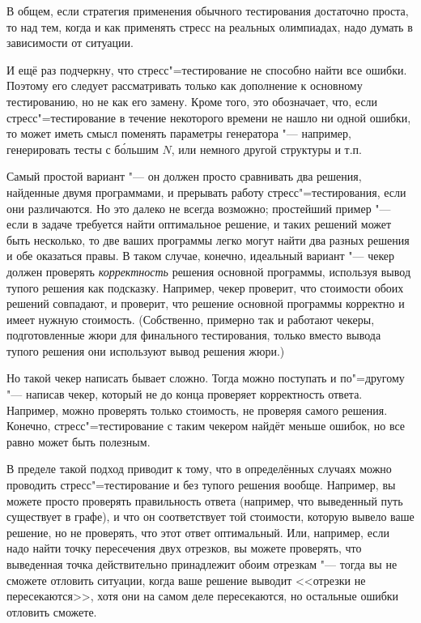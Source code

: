 В общем, если стратегия применения обычного тестирования достаточно проста, то над тем, когда и как применять стресс на реальных олимпиадах,
надо думать в зависимости от ситуации.

И ещё раз подчеркну, что стресс"=тестирование не способно найти все ошибки. 
Поэтому его следует рассматривать только как дополнение к основному тестированию, но не как его замену.
Кроме того, это обозначает, что, если стресс"=тестирование в течение некоторого времени не нашло ни одной ошибки,
то может иметь смысл поменять параметры генератора "--- например, генерировать тесты с б\'{о}льшим $N$, или немного другой структуры и т.п.

Самый простой вариант "--- он должен просто сравнивать два решения, найденные двумя программами, и прерывать работу стресс"=тестирования,
если они различаются.
Но это далеко не всегда возможно; простейший пример "--- если в задаче требуется найти оптимальное решение, и таких решений может быть несколько,
то две ваших программы легко могут найти два разных решения и обе оказаться правы.
В таком случае, конечно, идеальный вариант "--- чекер должен проверять \textit{корректность} решения основной программы, 
используя вывод тупого решения как подсказку. 
Например, чекер проверит, что стоимости обоих решений совпадают, и проверит, что решение основной программы корректно и имеет нужную стоимость.
(Собственно, примерно так и работают чекеры, подготовленные жюри для финального тестирования, только вместо вывода тупого решения они используют
вывод решения жюри.)

Но такой чекер написать бывает сложно. Тогда можно поступать и по"=другому "--- написав чекер, который не до конца проверяет корректность ответа.
Например, можно проверять только стоимость, не проверяя самого решения.
Конечно, стресс"=тестирование с таким чекером найдёт меньше ошибок, но все равно может быть полезным.

В пределе такой подход приводит к тому, что в определённых случаях можно проводить стресс"=тестирование и без тупого решения вообще.
Например, вы можете просто проверять правильность ответа (например, что выведенный путь существует в графе), и что он соответствует той стоимости,
которую вывело ваше решение, но не проверять, что этот ответ оптимальный. 
Или, например, если надо найти точку пересечения двух отрезков, вы можете проверять, что выведенная точка действительно принадлежит
обоим отрезкам "--- тогда вы не сможете отловить ситуации, когда ваше решение выводит <<отрезки не пересекаются>>, хотя они на самом деле пересекаются,
но остальные ошибки отловить сможете.

